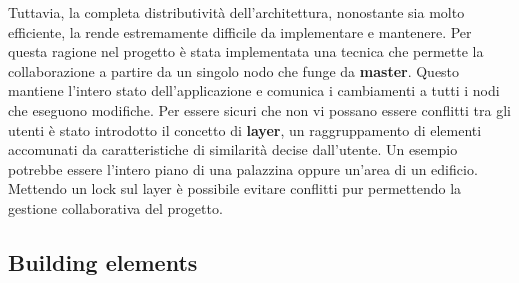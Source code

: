 Tuttavia, la completa distributivit\`a dell'architettura, nonostante sia molto efficiente, la rende estremamente difficile da implementare e mantenere. Per questa ragione nel progetto \`e stata implementata una tecnica che permette la collaborazione a partire da un singolo nodo che funge da \textbf{master}. Questo mantiene l'intero stato dell'applicazione e comunica i cambiamenti a tutti i nodi che eseguono modifiche. Per essere sicuri che non vi possano essere conflitti tra gli utenti \`e stato introdotto il concetto di \textbf{layer}, un raggruppamento di elementi accomunati da caratteristiche di similarit\`a decise dall'utente. Un esempio potrebbe essere l'intero piano di una palazzina oppure un'area di un edificio. Mettendo un lock sul layer \`e possibile evitare conflitti pur permettendo la gestione collaborativa del progetto.

\subsection{Building elements}\label{building_elements}

